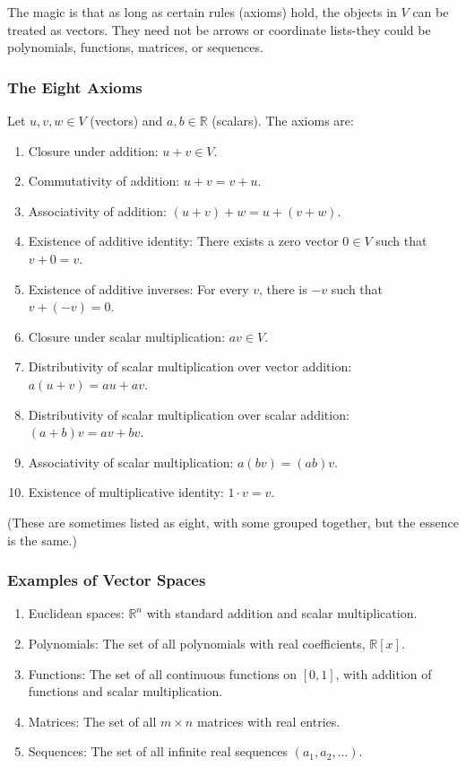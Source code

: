 \documentclass[
  letterpaper,
  DIV=11,
  numbers=noendperiod]{scrreprt}
\providecommand{\tightlist}{%
  \setlength{\itemsep}{0pt}\setlength{\parskip}{0pt}}
\begin{document}
The magic is that as long as certain rules (axioms) hold, the objects in
\(V\) can be treated as vectors. They need not be arrows or coordinate
lists-they could be polynomials, functions, matrices, or sequences.

\subsubsection{The Eight Axioms}\label{the-eight-axioms}

Let \(u, v, w \in V\) (vectors) and \(a, b \in \mathbb{R}\) (scalars).
The axioms are:

\begin{enumerate}
\def\labelenumi{\arabic{enumi}.}
\tightlist
\item
  Closure under addition: \(u + v \in V\).
\item
  Commutativity of addition: \(u + v = v + u\).
\item
  Associativity of addition: \((u + v) + w = u + (v + w)\).
\item
  Existence of additive identity: There exists a zero vector \(0 \in V\)
  such that \(v + 0 = v\).
\item
  Existence of additive inverses: For every \(v\), there is \(-v\) such
  that \(v + (-v) = 0\).
\item
  Closure under scalar multiplication: \(a v \in V\).
\item
  Distributivity of scalar multiplication over vector addition:
  \(a(u + v) = au + av\).
\item
  Distributivity of scalar multiplication over scalar addition:
  \((a + b)v = av + bv\).
\item
  Associativity of scalar multiplication: \(a(bv) = (ab)v\).
\item
  Existence of multiplicative identity: \(1 \cdot v = v\).
\end{enumerate}

(These are sometimes listed as eight, with some grouped together, but
the essence is the same.)

\subsubsection{Examples of Vector
Spaces}\label{examples-of-vector-spaces}

\begin{enumerate}
\def\labelenumi{\arabic{enumi}.}
\tightlist
\item
  Euclidean spaces: \(\mathbb{R}^n\) with standard addition and scalar
  multiplication.
\item
  Polynomials: The set of all polynomials with real coefficients,
  \(\mathbb{R}[x]\).
\item
  Functions: The set of all continuous functions on \([0,1]\), with
  addition of functions and scalar multiplication.
\item
  Matrices: The set of all \(m \times n\) matrices with real entries.
\item
  Sequences: The set of all infinite real sequences
  \((a_1, a_2, \dots)\).
\end{enumerate}
\end{document}
